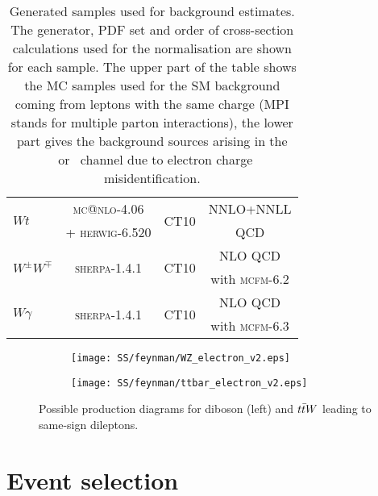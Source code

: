 \begin{table}[ht]
\begin{center}
\begin{tabular}{l|c|c|c}
\hline
\multirow{2}{*}{$Wt$} & {\scshape mc@nlo-4.06}  & \multirow{2}{*}{CT10}& {NNLO+NNLL } \\
   & + {\scshape herwig-6.520} & & QCD \cite{top7,top8}\\
\hline
\multirow{2}{*}{$W^{\pm}W^{\mp}$} & \multirow{2}{*}{{\scshape sherpa-1.4.1}} & \multirow{2}{*}{CT10}& NLO QCD \\
& &  & with {\scshape mcfm-6.2}\\
\hline
\multirow{2}{*}{$W\gamma$} & \multirow{2}{*}{{\scshape sherpa}-1.4.1} & \multirow{2}{*}{CT10}& NLO QCD\\
& &  & with {\scshape mcfm-6.3}\\
\hline
\end{tabular}
\end{center}
  \caption{Generated samples used for background estimates. The generator, PDF set and order of cross-section calculations used for the normalisation
  are shown for each sample.
  The upper part of the table shows the MC samples used for the SM background coming from leptons with the same charge (MPI stands for multiple parton interactions), the lower part gives the background sources arising in the \ee\ or \emu\ channel due to electron charge misidentification.}
\label{tab:MC_cross}
\end{table}

\begin{figure}

\begin{subfigure}{.5\textwidth}
  \centering
  \texttt{[image: SS/feynman/WZ\_electron\_v2.eps]}
\end{subfigure}%
\begin{subfigure}{.5\textwidth}
  \centering
  \texttt{[image: SS/feynman/ttbar\_electron\_v2.eps]}
\end{subfigure}

\caption{Possible production diagrams for diboson (left) and $t\bar{t} W$ leading to same-sign dileptons. }
  \label{fig:precHitFracPerTrack}
\end{figure}


\section{Event selection}


